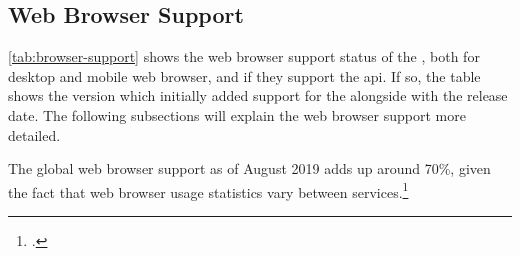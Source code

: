 \subsection{Web Browser Support}

\autoref{tab:browser-support} shows the web browser support status of the \wa{}, both for desktop and mobile web browser, and if they support the \gls{api}. If so, the table shows the version which initially added support for the \wa{} alongside with the release date. The following subsections will explain the web browser support more detailed.

The global web browser support as of August 2019 adds up around 70\%, given the fact that web browser usage statistics vary between services.\footcites[The obtained data is available in the Appendix \autoref{sec:stats}, see][]{statcounter-global}

\newpage

